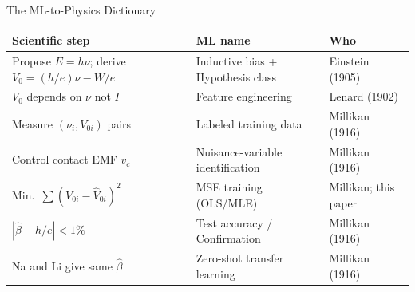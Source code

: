 \documentclass[aspectratio=169,12pt]{beamer}
\begin{document}
\begin{frame}[shrink=30]{The ML-to-Physics Dictionary}

\begin{center}
\footnotesize
\renewcommand{\arraystretch}{1.10}
\begin{tabular}{p{4.8cm}p{4.8cm}p{3.5cm}}
\toprule
\textbf{Scientific step} & \textbf{ML name} & \textbf{Who} \\
\midrule
Propose $E = h\nu$; derive $V_0 = (h/e)\nu - W/e$ & Inductive bias + Hypothesis class & Einstein (1905) \\
$V_0$ depends on $\nu$ not $I$ & Feature engineering & Lenard (1902) \\
Measure $(\nu_i, V_{0i})$ pairs & Labeled training data & Millikan (1916) \\
Control contact EMF $v_c$ & Nuisance-variable identification & Millikan (1916) \\
Min.\ $\sum(V_{0i} - \hat V_{0i})^2$ & MSE training (OLS/MLE) & Millikan; this paper \\
$|\hat\beta - h/e| < 1\%$ & Test accuracy / Confirmation & Millikan (1916) \\
Na and Li give same $\hat\beta$ & Zero-shot transfer learning & Millikan (1916) \\
\bottomrule
\end{tabular}
\end{center}

\end{frame}
\end{document}
